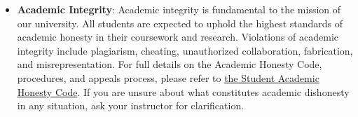 \documentclass[11pt, a4paper]{article}
\begin{document}
\begin{itemize}
    \item \textbf{Academic Integrity}: Academic integrity is fundamental to the mission of our university. All students are expected to uphold the highest standards of academic honesty in their coursework and research. Violations of academic integrity include plagiarism, cheating, unauthorized collaboration, fabrication, and misrepresentation. For full details on the Academic Honesty Code, procedures, and appeals process, please refer to \href{https://www.binghamton.edu/watson/about/academic-honesty.html}{the Student Academic Honesty Code}. If you are unsure about what constitutes academic dishonesty in any situation, ask your instructor for clarification.
\end{itemize}

\end{document}
